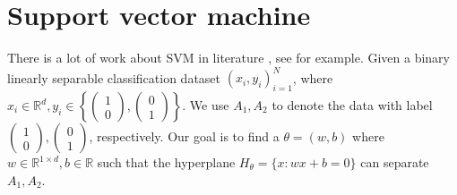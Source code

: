 \section{Support vector machine}\label{sec:SVMintro}%
There is a lot of work about SVM in literature , see \cite{drucker1997support,ben2001support,cortes1995support,cristianini2000introduction} for example.
Given a binary linearly separable classification dataset ${(x_i,y_i)}_{i = 1}^N$, where $x_i\in \mathbb{R}^d, y_i\in \left \{\begin{pmatrix}1\\0\end{pmatrix}, \begin{pmatrix}0\\1\end{pmatrix}\right \}$. We use $A_1,A_2$ to denote the data with label $\begin{pmatrix}1\\0\end{pmatrix}, \begin{pmatrix}0\\1\end{pmatrix}$, respectively. Our goal is to find a $\theta = (w,b)$ where $w\in \mathbb{R}^{1\times d}, b\in \mathbb{R}$ such that the hyperplane $H_{\theta} = \{x:wx + b = 0\}$ can separate $A_1,A_2$.

